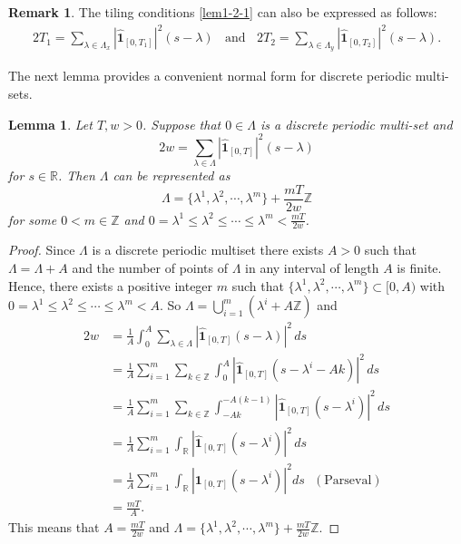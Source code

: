 \documentclass[12pt,a4paper,intlimits,sumlimits]{amsart}
\theoremstyle{plain}
\newtheorem{lemma}{Lemma}
\theoremstyle{definition}
\newtheorem{remark}{Remark}
\newcommand{\RR}{{\mathbb R}}
\newcommand{\ZZ}{{\mathbb Z}}
\newcounter{rem}
\begin{document}
 \begin{remark}\label{rem:tiling}
The tiling conditions \eqref{lem1-2-1} can also be expressed as follows:
 \begin{align}\label{lem1-2-1-1}
  2 T_1 =\sum_{\lambda \in \Lambda_x}\left|\hat{ \mathbf{1}}_{\left[0, T_1\right]}\right|^2\left(s-\lambda\right)
\ \ \  \ \text{and} \ \ \ \  2 T_2 =\sum_{\lambda \in \Lambda_y}\left|\hat{ \mathbf{1}}_{\left[0, T_2\right]}\right|^2\left(s-\lambda\right).
\end{align}
\end{remark}
 The next lemma provides a convenient normal form for discrete periodic multi-sets. 
\begin{lemma}\label{period}
Let $T, w > 0$. Suppose that $0 \in \Lambda $ is  a discrete periodic  multi-set  and   $$2w=\sum_{\lambda  \in \Lambda}\left|\hat{ \mathbf{1}}_{\left[0, T\right]}\right|^2\left(s-\lambda\right) $$ for $s\in\RR$. Then $\Lambda$  can be represented  as 
 $$\Lambda=\{\lambda^{1}, \lambda^{2},\cdots, \lambda^{m}\}+\frac{mT}{2w}\mathbb{Z} $$
for some  $0 < m\in\ZZ$ and $0 = \lambda^{1}\leq\lambda^{2}\leq\cdots\leq\lambda^{m}<\frac{mT}{2w}$.
\end{lemma}
\begin{proof}
Since $\Lambda $ is  a discrete periodic  multiset  there exists $A>0$ such that $\Lambda=\Lambda+A$   and  the number of points of $ \Lambda$ in any interval of length $ A$ is finite. Hence, there exists a positive integer $m$ such that    $\{\lambda^{1}, \lambda^{2},\cdots, \lambda^{m}\}\subset[0,  A)$ with $0=\lambda^{1}\leq\lambda^{2}\leq\cdots\leq\lambda^{m}<A$. So $ \Lambda=\bigcup_{i=1}^{m}(\lambda^{i}+   A\mathbb{Z})$ and 
\begin{align*}
 2 w &= \frac{1}{ A} \int_0^{A} \sum_{\lambda \in  \Lambda } \left|\hat{ \mathbf{1}}_{\left[0, T\right]}\left(s-\lambda\right)\right|^2 \, ds\\
&=\frac{1}{  A} \sum_{i=1}^{m} \sum_{k\in  \mathbb{Z}} \int_0^{  A} \left|\hat{ \mathbf{1}}_{\left[0, T \right]}\left(s-\lambda^i- Ak\right)\right|^2 \, ds
\\&= \frac{1}{  A} \sum_{i=1}^{m} \sum_{k\in  \mathbb{Z}} \int_{- Ak}^{- A(k-1)} \left|\hat{ \mathbf{1}}_{\left[0, T \right]}\left(s-\lambda^i\right)\right|^2 \, ds
\\&= \frac{1}{  A} \sum_{i=1}^{m} \int_\mathbb{R} \left|\hat{ \mathbf{1}}_{\left[0, T \right]}\left(s-\lambda^i\right)\right|^2 \, ds
\\&= \frac{1}{  A} \sum_{i=1}^{m} \int_\mathbb{R} \left| \mathbf{1}_{\left[0, T\right]}\left(s-\lambda^i\right)\right|^2 ds \ \ \ (\text{Parseval})
\\&= \frac{mT }{ A}.
\end{align*}
This means that $ A= \frac{mT}{2w}$  and $\Lambda=\{\lambda^{1}, \lambda^{2},\cdots, \lambda^{m}\}+\frac{mT}{2w}\mathbb{Z}$. 

\end{proof}
\end{document}
